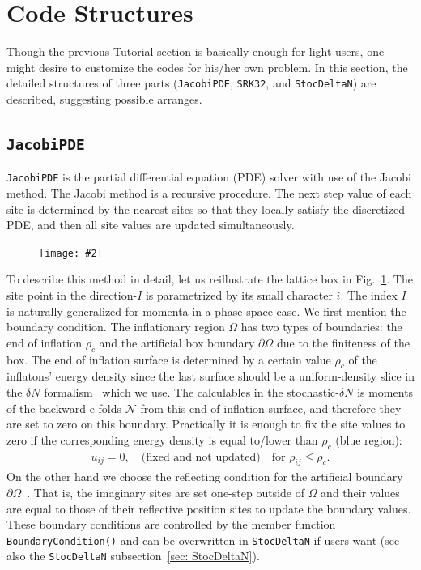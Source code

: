 \documentclass[aps, prd
, preprint
, nofootinbib 
, notitlepage
, superscriptaddress
, longbibliography
]{revtex4-1}
\newcommand{\calN}{\mathcal{N}}
\newcommand{\bae}[1]{\begin{align} #1 \end{align}}
\newcommand{\bfe}[4]{
\begin{figure} 
	\centering
	\texttt{[image: \#2]}
	\caption{#3}
	\label{#4}
\end{figure}}
\begin{document}
\section{Code Structures}

Though the previous Tutorial section is basically enough for light users, one might desire to customize the codes for his/her own problem.
In this section, the detailed structures of three parts (\texttt{JacobiPDE}, \texttt{SRK32}, and \texttt{StocDeltaN}) are described, suggesting possible arranges.


\subsection{\texttt{JacobiPDE}}

\texttt{JacobiPDE} is the partial differential equation (PDE) solver with use of the Jacobi method.
The Jacobi method is a recursive procedure.
The next step value of each site is determined by the nearest sites so that they locally satisfy the discretized PDE, and then all site values are updated simultaneously. 

\bfe{width=0.9\hsize}{figs/lattice.pdf}{}{fig: lattice}

To describe this method in detail, let us reillustrate the lattice box in Fig.~\ref{fig: lattice}. 
The site point in the direction-$I$ is parametrized by its small character $i$.
The index $I$ is naturally generalized for momenta in a phase-space case.
We first mention the boundary condition.
The inflationary region $\Omega$ has two types of boundaries: the end of inflation $\rho_c$ and the artificial box boundary $\partial\Omega$ due to the finiteness of the box.
The end of inflation surface is determined by a certain value $\rho_c$ of the inflatons' energy density since the last surface should be a uniform-density slice in the $\delta N$ formalism~\cite{Lyth:2004gb} which we use.
The calculables in the stochastic-$\delta N$ is moments of the backward e-folds $\calN$ from this end of inflation surface, and therefore they are set to zero on this boundary. Practically it is enough to fix the site values to zero if the corresponding energy density is equal to/lower than $\rho_c$ (blue region):
\bae{
    u_{ij}=0, \quad \text{(fixed and not updated)} \quad \text{for $\rho_{ij}\leq\rho_c$}.
}
On the other hand we choose the reflecting condition for the artificial boundary $\partial\Omega$~\cite{Pattison:2017mbe}.
That is, the imaginary sites are set one-step outside of $\Omega$ and their values are equal to those of their reflective position sites to update the boundary values.
These boundary conditions are controlled by the member function \texttt{BoundaryCondition()} and can be overwritten in \texttt{StocDeltaN} if users want (see also the \texttt{StocDeltaN} subsection~\ref{sec: StocDeltaN}).
\end{document}
